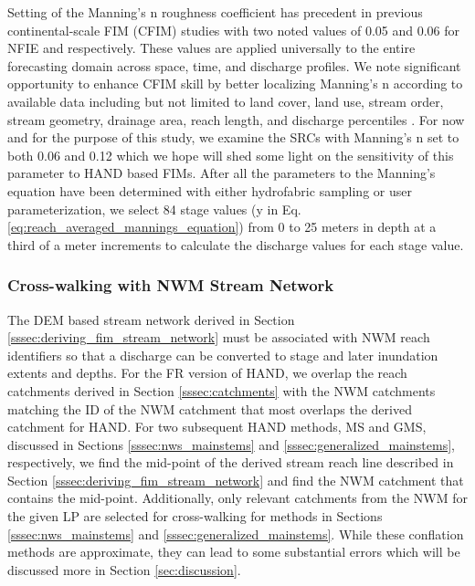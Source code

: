 \documentclass[draft]{dependencies/agujournal2019}
\begin{document}
Setting of the Manning's n roughness coefficient has precedent in previous continental-scale FIM (CFIM) studies \cite{maidment2017conceptual,liu2016cybergis,liu2020height,djokic2019arc,garousi2019terrain,zheng2018geoflood} with two noted values of 0.05 and 0.06 for NFIE and  respectively. 
These values are applied universally to the entire forecasting domain across space, time, and discharge profiles.
We note significant opportunity to enhance CFIM skill by better localizing Manning's n according to available data including but not limited to land cover, land use, stream order, stream geometry, drainage area, reach length, and discharge percentiles \cite{garousi2019terrain,johnson2019integrated}.
For now and for the purpose of this study, we examine the SRCs with Manning's n set to both 0.06 and 0.12 which we hope will shed some light on the sensitivity of this parameter to HAND based FIMs.
After all the parameters to the Manning's equation have been determined with either hydrofabric sampling or user parameterization, we select 84 stage values (y in Eq. \ref{eq:reach_averaged_mannings_equation}) from 0 to 25 meters in depth at a third of a meter increments to calculate the discharge values for each stage value. 
%
\subsubsection{Cross-walking with NWM Stream Network}
\label{sssec:cross_walking_networks}
%
The DEM based stream network derived in Section \ref{sssec:deriving_fim_stream_network} must be associated with NWM reach identifiers so that a discharge can be converted to stage and later inundation extents and depths.
For the FR version of HAND, we overlap the reach catchments derived in Section \ref{sssec:catchments} with the NWM catchments matching the ID of the NWM catchment that most overlaps the derived catchment for HAND.
For two subsequent HAND methods, MS and GMS, discussed in Sections \ref{sssec:nws_mainstems} and \ref{sssec:generalized_mainstems}, respectively, we find the mid-point of the derived stream reach line described in Section \ref{sssec:deriving_fim_stream_network} and find the NWM catchment that contains the mid-point.
Additionally, only relevant catchments from the NWM for the given LP are selected for cross-walking for methods in Sections \ref{sssec:nws_mainstems} and \ref{sssec:generalized_mainstems}.
While these conflation methods are approximate, they can lead to some substantial errors which will be discussed more in Section \ref{sec:discussion}.
%
\end{document}
